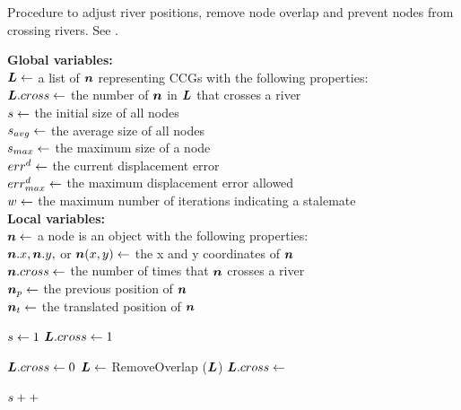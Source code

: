 \begin{algorithm}[tb!]
    \caption{Procedure to adjust river positions, remove node overlap and prevent nodes from crossing rivers. See .}\label{alg:UpdateLayout}
    \textbf{Global variables:} \\
    $ \bm{L} \gets $ a list of $ \bm{n} $ representing CCGs with the following properties: \\
    \-\hspace{1em}  $\bm{L}.cross \gets $ the number of $ \bm{n} $ in $ \bm{L} $ that crosses a river \\

    $ s \gets $ the initial size of all nodes \\
    $ s_{avg} \gets $ the average size of all nodes \\
    $ s_{max} \gets $ the maximum size of a node \\
    $ err^{d} \gets $ the current displacement error \\
    $ err^{d}_{max} \gets $ the maximum displacement error allowed \\
    $ w \gets $ the maximum number of iterations indicating a stalemate \\

    \textbf{Local variables:} \\
    $ \bm{n} \gets $ a node is an object with the following properties: \\
    \-\hspace{1em} $ \bm{n}.x, \bm{n}.y, $ or $ \bm{n}(x,y) \gets $ the x and y coordinates of $ \bm{n} $ \\
    \-\hspace{1em} $ \bm{n}.cross \gets $ the number of times that $ \bm{n} $ crosses a river \\
    \-\hspace{1em} $ \bm{n}_{p} \gets $ the previous position of $ \bm{n} $ \\
    \-\hspace{1em} $ \bm{n}_t \gets $ the translated position of $ \bm{n} $ \\

    \begin{algorithmic}[1]

        \State $ s \gets 1 $
        \State $ \bm{L}.cross \gets 1 $ 

        \State $ \bm{L}.cross \gets 0 $
        \State $ \bm{L} \gets $ RemoveOverlap ($ \bm{L} $)
        \State {}
        \State $\bm{L}.cross \gets $ 

        \EndWhile

        \State $ s ++ $

        \EndWhile

        \EndProcedure
    \end{algorithmic}
\end{algorithm}


